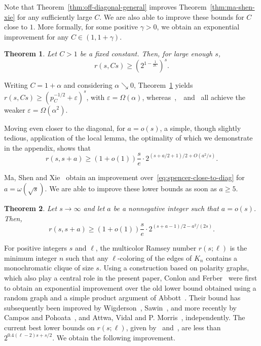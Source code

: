 \documentclass{article}
\theoremstyle{plain}
\newtheorem{theorem}{Theorem}[section]
\theoremstyle{definition}
\def\eps {\varepsilon}
\begin{document}
Note that Theorem~\ref{thm:off-diagonal-general} improves Theorem~\ref{thm:ma-shen-xie} for any sufficiently large $C$. We are also able to improve these bounds for $C$ close to $1$. More formally, for some positive $\gamma > 0$, we obtain an exponential improvement for any $C \in (1, 1+\gamma)$.
\begin{theorem} \label{thm:k-Ck}
    Let $C > 1$ be a fixed constant. Then, for large enough $s$,
    \[ r(s, Cs) \ge (2^{1 - \frac{1}{2C}})^s. \]
\end{theorem}
Writing $C = 1 + \alpha$ and considering $\alpha \searrow 0$, Theorem~\ref{thm:k-Ck} yields $r(s, Cs) \ge (p_C^{-1/2} + \eps)^s$, with $\eps = \Omega(\alpha)$, whereas~\cite{ma-shen-xie},~\cite{hunter-milojevic-sudakov}~and~\cite{lin-niu} all achieve the weaker $\eps = \Omega(\alpha^2)$.

Moving even closer to the diagonal, for $a = o(s)$, a simple, though slightly tedious, application of the local lemma, the optimality of which we demonstrate in the appendix, shows that 
\begin{equation} \label{eq:spencer-close-to-diag}
    r(s, s+a) \ge (1 + o(1)) \frac{s}{e} \cdot 2^{(s+a/2+1)/2 + O(a^2/s)}.
\end{equation}

Ma, Shen and Xie~\cite{ma-shen-xie} obtain an improvement over~\eqref{eq:spencer-close-to-diag} for $a = \omega(\sqrt{s})$. We are able to improve these lower bounds as soon as $a \ge 5$.
\begin{theorem} \label{thm:close}
    Let $s \rightarrow \infty$ and let $a$ be a nonnegative integer such that $a = o(s)$. Then, 
    \[ r(s, s+a) \ge (1 + o(1)) \frac{s}{e}\cdot 2^{(s+a-1)/2 - a^2 / (2s)}. \]
\end{theorem}

For positive integers $s$ and $\ell$, the multicolor Ramsey number $r(s; \ell)$ is the minimum integer $n$ such that any \mbox{$\ell$-coloring} of the edges of $K_n$ contains a monochromatic clique of size $s$. Using a construction based on polarity graphs, which also play a central role in the present paper, Conlon and Ferber~\cite{conlon-ferber} were first to obtain an exponential improvement over the old lower bound obtained using a random graph and a simple product argument of Abbott~\cite{abbott}. Their bound has subsequently been improved by Wigderson~\cite{wigderson}, Sawin~\cite{sawin}, and more recently by Campos and Pohoata~\cite{campos-pohoata}, and Attwa, Vidal and P. Morris~\cite{attwa-vidal-morris}, independently. The current best lower bounds on $r(s; \ell)$, given by~\cite{campos-pohoata} and~\cite{attwa-vidal-morris}, are less than $2^{0.4(\ell-2) s + s/2}$. We obtain the following improvement.
\end{document}
